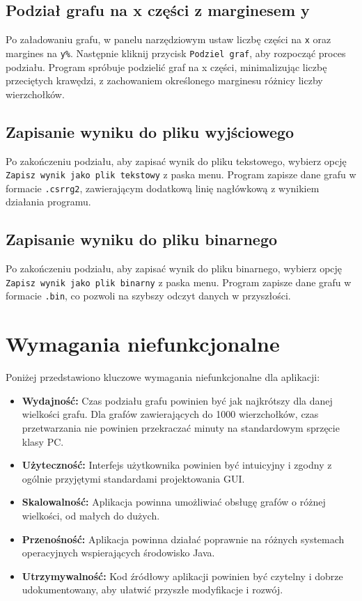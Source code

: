 \documentclass{article}
\begin{document}
    \subsection{Podział grafu na x części z marginesem y}
    
    Po załadowaniu grafu, w panelu narzędziowym ustaw liczbę części na \texttt{x} oraz margines na \texttt{y\%}. Następnie kliknij przycisk \texttt{Podziel graf}, aby rozpocząć proces podziału. Program spróbuje podzielić graf na x części, minimalizując liczbę przeciętych krawędzi, z zachowaniem określonego marginesu różnicy liczby wierzchołków.
    
    \subsection{Zapisanie wyniku do pliku wyjściowego}
    
    Po zakończeniu podziału, aby zapisać wynik do pliku tekstowego, wybierz opcję \texttt{Zapisz wynik jako plik tekstowy} z paska menu. Program zapisze dane grafu w formacie \texttt{.csrrg2}, zawierającym dodatkową linię nagłówkową z wynikiem działania programu.
    
    \subsection{Zapisanie wyniku do pliku binarnego}
    
    Po zakończeniu podziału, aby zapisać wynik do pliku binarnego, wybierz opcję \texttt{Zapisz wynik jako plik binarny} z paska menu. Program zapisze dane grafu w formacie \texttt{.bin}, co pozwoli na szybszy odczyt danych w przyszłości.



\section{Wymagania niefunkcjonalne}

    Poniżej przedstawiono kluczowe wymagania niefunkcjonalne dla aplikacji:
    
    \begin{itemize}
        \item \textbf{Wydajność:} Czas podziału grafu powinien być jak najkrótszy dla danej wielkości grafu. Dla grafów zawierających do 1000 wierzchołków, czas przetwarzania nie powinien przekraczać minuty na standardowym sprzęcie klasy PC.
        \item \textbf{Użyteczność:} Interfejs użytkownika powinien być intuicyjny i zgodny z ogólnie przyjętymi standardami projektowania GUI.
        \item \textbf{Skalowalność:} Aplikacja powinna umożliwiać obsługę grafów o różnej wielkości, od małych do dużych.
        \item \textbf{Przenośność:} Aplikacja powinna działać poprawnie na różnych systemach operacyjnych wspierających środowisko Java.
        \item \textbf{Utrzymywalność:} Kod źródłowy aplikacji powinien być czytelny i dobrze udokumentowany, aby ułatwić przyszłe modyfikacje i rozwój.
    \end{itemize}
\end{document}
